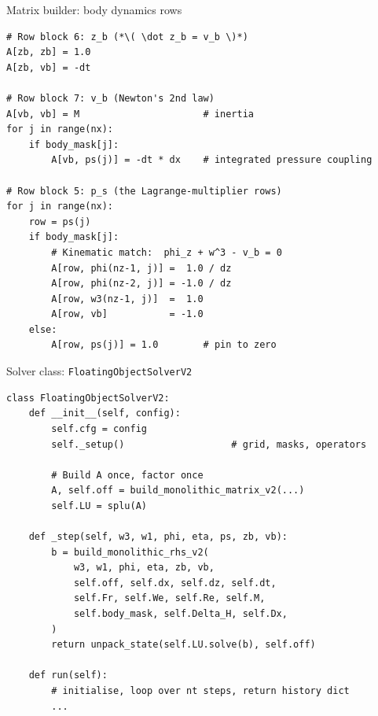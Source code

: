 \documentclass[aspectratio=169, 10pt]{beamer}
\begin{document}
\begin{frame}[fragile]{Matrix builder: body dynamics rows}
\begin{lstlisting}
# Row block 6: z_b (*\( \dot z_b = v_b \)*)
A[zb, zb] = 1.0
A[zb, vb] = -dt

# Row block 7: v_b (Newton's 2nd law)
A[vb, vb] = M                      # inertia
for j in range(nx):
    if body_mask[j]:
        A[vb, ps(j)] = -dt * dx    # integrated pressure coupling

# Row block 5: p_s (the Lagrange-multiplier rows)
for j in range(nx):
    row = ps(j)
    if body_mask[j]:
        # Kinematic match:  phi_z + w^3 - v_b = 0
        A[row, phi(nz-1, j)] =  1.0 / dz
        A[row, phi(nz-2, j)] = -1.0 / dz
        A[row, w3(nz-1, j)]  =  1.0
        A[row, vb]           = -1.0
    else:
        A[row, ps(j)] = 1.0        # pin to zero
\end{lstlisting}
\end{frame}

\begin{frame}[fragile]{Solver class: \texttt{FloatingObjectSolverV2}}
\begin{lstlisting}
class FloatingObjectSolverV2:
    def __init__(self, config):
        self.cfg = config
        self._setup()                   # grid, masks, operators

        # Build A once, factor once
        A, self.off = build_monolithic_matrix_v2(...)
        self.LU = splu(A)

    def _step(self, w3, w1, phi, eta, ps, zb, vb):
        b = build_monolithic_rhs_v2(
            w3, w1, phi, eta, zb, vb,
            self.off, self.dx, self.dz, self.dt,
            self.Fr, self.We, self.Re, self.M,
            self.body_mask, self.Delta_H, self.Dx,
        )
        return unpack_state(self.LU.solve(b), self.off)

    def run(self):
        # initialise, loop over nt steps, return history dict
        ...
\end{lstlisting}
\end{frame}

\end{document}

